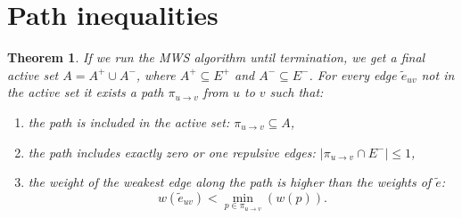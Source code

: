 \documentclass[12pt]{article}
\newtheorem{theorem}{Theorem}[section]
\begin{document}
\section{Path inequalities}
\begin{theorem}
If we run the MWS algorithm until termination, we get a final active set ${A = A^{+} \cup A^{-}}$, where $A^{+} \subseteq E^+$ and $A^{-} \subseteq E^-$. For every edge $\tilde{e}_{uv}$ not in the active set %
it exists a path $\pi_{u \rightarrow v}$ from $u$ to $v$ such that:
\begin{enumerate}
\item the path is included in the active set: $\pi_{u \rightarrow v} \subseteq A$,  \label{cond_1} 
\item the path includes exactly zero or one repulsive edges: $\left| \pi_{u \rightarrow v} \cap E^{-}  \right| \leq 1$, \\
 \label{cond_2} 
\item the weight of the weakest edge along the path is higher than the weights of $\tilde{e}$: \label{cond_3}
\[ 
w(\tilde{e}_{uv}) < \min_{p\in \pi_{u \rightarrow v}}  (w(p)).
\]
\end{enumerate} 
\end{theorem}
\end{document}
